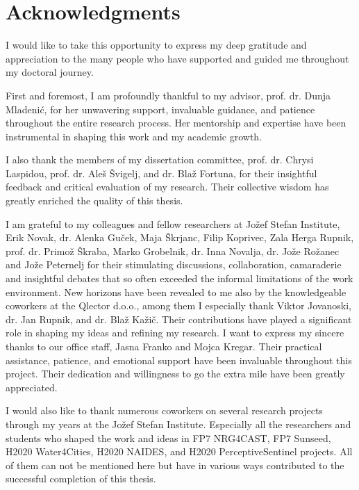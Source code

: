 % 
\chapter*{Acknowledgments}

I would like to take this opportunity to express my deep gratitude and appreciation to the many people who have supported and guided me throughout my doctoral journey.

First and foremost, I am profoundly thankful to my advisor, prof. dr. Dunja Mladenić, for her unwavering support, invaluable guidance, and patience throughout the entire research process. 
Her mentorship and expertise have been instrumental in shaping this work and my academic growth.

I also thank the members of my dissertation committee, prof. dr. Chrysi Laspidou, prof. dr. Aleš Švigelj, and dr. Blaž Fortuna, for their insightful feedback and critical evaluation of my research.
Their collective wisdom has greatly enriched the quality of this thesis.

I am grateful to my colleagues and fellow researchers at Jožef Stefan Institute, Erik Novak, dr. Alenka Guček, Maja Škrjanc, Filip Koprivec, Zala Herga Rupnik, prof. dr. Primož Škraba, Marko Grobelnik, dr. Inna Novalja, dr. Jože Rožanec and Jože Peternelj for their stimulating discussions, collaboration, camaraderie and insightful debates that so often exceeded the informal limitations of the work environment.
New horizons have been revealed to me also by the knowledgeable coworkers at the Qlector d.o.o., among them I especially thank Viktor Jovanoski, dr. Jan Rupnik, and dr. Blaž Kažič.
Their contributions have played a significant role in shaping my ideas and refining my research.
I want to express my sincere thanks to our office staff, Jasna Franko and Mojca Kregar.
Their practical assistance, patience, and emotional support have been invaluable throughout this project.
Their dedication and willingness to go the extra mile have been greatly appreciated.

I would also like to thank numerous coworkers on several research projects through my years at the Jožef Stefan Institute. 
Especially all the researchers and students who shaped the work and ideas in FP7 NRG4CAST, FP7 Sunseed, H2020 Water4Cities, H2020 NAIDES, and H2020 PerceptiveSentinel projects.
All of them can not be mentioned here but have in various ways contributed to the successful completion of this thesis. 

